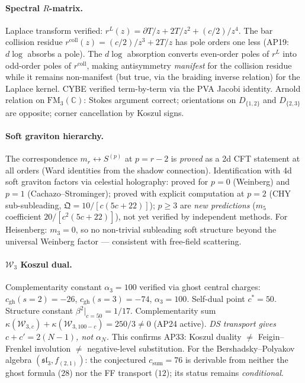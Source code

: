 \documentclass[11pt]{article}
\newcommand{\C}{\mathbb{C}}
\newcommand{\FM}{\mathrm{FM}}
\begin{document}
\paragraph{Spectral $R$-matrix.}  Laplace transform verified:
$r^L(z) = \partial T/z + 2T/z^2 + (c/2)/z^4$.  The bar collision
residue $r^{\mathrm{coll}}(z) = (c/2)/z^3 + 2T/z$ has pole orders
one less (AP19: $d\log$ absorbs a pole).  The $d\log$ absorption
converts even-order poles of $r^L$ into odd-order poles of
$r^{\mathrm{coll}}$, making antisymmetry \emph{manifest} for the
collision residue while it remains non-manifest (but true, via the
braiding inverse relation) for the Laplace kernel.  CYBE verified
term-by-term via the PVA Jacobi identity.  Arnold relation on
$\FM_3(\C)$: Stokes argument correct; orientations on
$D_{\{1,2\}}$ and $D_{\{2,3\}}$ are opposite; corner cancellation
by Koszul signs.

\paragraph{Soft graviton hierarchy.}  The correspondence
$m_r \leftrightarrow S^{(p)}$ at $p = r-2$ is \emph{proved} as a 2d
CFT statement at all orders (Ward identities from the shadow
connection).  Identification with 4d soft graviton factors via
celestial holography: proved for $p = 0$ (Weinberg) and $p = 1$
(Cachazo--Strominger); proved with explicit computation at $p = 2$
(CHY sub-subleading, $\mathfrak{Q} = 10/[c(5c+22)]$); $p \ge 3$
are \emph{new predictions} ($m_5$ coefficient $20/[c^2(5c+22)]$),
not yet verified by independent methods.  For Heisenberg:
$m_3 = 0$, so no non-trivial subleading soft structure beyond the
universal Weinberg factor --- consistent with free-field scattering.

\paragraph{$\mathcal{W}_3$ Koszul dual.}  Complementarity constant
$\alpha_3 = 100$ verified via ghost central charges:
$c_{\mathrm{gh}}(s=2) = -26$, $c_{\mathrm{gh}}(s=3) = -74$,
$\alpha_3 = 100$.  Self-dual point $c^* = 50$.  Structure constant
$\beta^2|_{c=50} = 1/17$.
Complementarity sum
$\kappa(\mathcal{W}_{3,c}) + \kappa(\mathcal{W}_{3,100-c})
= 250/3 \ne 0$ (AP24 active).
\emph{DS transport gives $c + c' = 2(N-1)$, not $\alpha_N$.}
This confirms AP33: Koszul duality $\ne$ Feigin--Frenkel involution
$\ne$ negative-level substitution.  For the Bershadsky--Polyakov
algebra $(\mathfrak{sl}_3, f_{(2,1)})$: the conjectured
$c_{\mathrm{sum}} = 76$ is derivable from neither the ghost formula
($28$) nor the FF transport ($12$); its status remains
\emph{conditional}.
\end{document}
